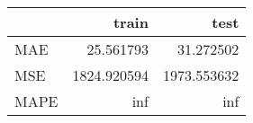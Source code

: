 \begin{tabular}{lrr}
\toprule
{} &        train &         test \\
\midrule
MAE  &    25.561793 &    31.272502 \\
MSE  &  1824.920594 &  1973.553632 \\
MAPE &          inf &          inf \\
\bottomrule
\end{tabular}
